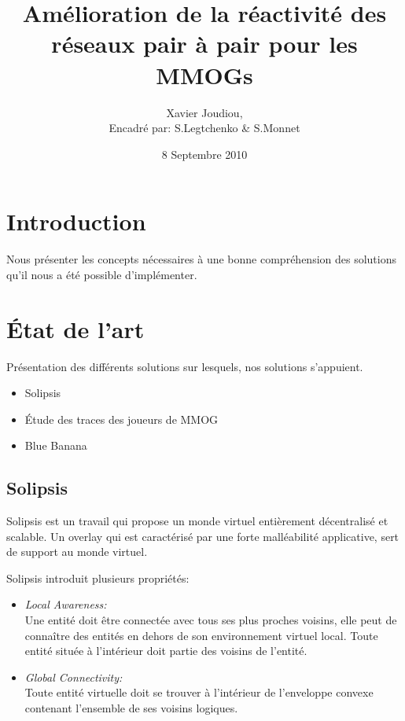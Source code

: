 \documentclass{beamer}
\title{Amélioration de la réactivité des réseaux pair à pair pour les MMOGs}
\author{Xavier Joudiou,\\\tiny{Encadré par: S.Legtchenko \& S.Monnet}}\institute{Université Paris VI, Master SAR}
\date{8 Septembre 2010}
\begin{document}
  \begin{frame}
  \maketitle
  \end{frame}


  \begin{frame}
  \tableofcontents
  \end{frame}

  \section{Introduction}
  \begin{frame}
	Nous présenter les concepts nécessaires à une bonne compréhension des solutions qu'il nous a été possible d'implémenter.
  \end{frame}
	
  \section{État de l'art}
  \begin{frame}
	Présentation des différents solutions sur lesquels, nos solutions s'appuient.
	\begin{itemize}
		\item Solipsis
		\item Étude des traces des joueurs de MMOG
		\item Blue Banana
	\end{itemize}
  \end{frame}

  \subsection{Solipsis}

  \begin{frame}
 Solipsis est un travail qui propose un monde virtuel entièrement décentralisé et scalable. Un overlay qui est caractérisé par une forte malléabilité applicative, sert de support au monde virtuel.

  \end{frame}

  \begin{frame}
	Solipsis introduit plusieurs propriétés:
	\begin{itemize}
                \item \textit{Local Awareness:}\\
                Une entité doit être connectée avec tous ses plus proches voisins, elle peut de connaître des entités en dehors de son environnement virtuel local. Toute entité située à l'intérieur doit partie des voisins de l'entité.
                \item \textit{Global Connectivity:}\\
                Toute entité virtuelle doit se trouver à l'intérieur de l'enveloppe convexe contenant l'ensemble de ses voisins logiques. \\
	\end{itemize}
  \end{frame}
\end{document}
